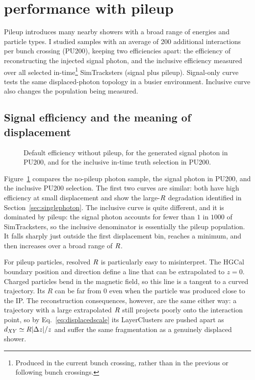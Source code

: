 \section{\cluethreed{} performance with pileup}
\label{sec:pileup}

Pileup introduces many nearby showers with a broad range of energies and
particle types. I studied samples with an average of 200 additional interactions per bunch
crossing (PU200), keeping two efficiencies apart: the efficiency of
reconstructing the injected signal photon, and the inclusive efficiency
measured over all selected in-time\footnote{Produced in the current bunch
crossing, rather than in the previous or following bunch crossings.}
SimTracksters (signal plus pileup). Signal-only curve tests the same displaced-photon topology in a busier
environment. Inclusive curve also changes the population being
measured.

\subsection{Signal efficiency and the meaning of displacement}

\begin{figure}[!htbp]
  \centering
{}
  \caption{Default \cluethreed{} efficiency without pileup, for the generated
  signal photon in PU200, and for the inclusive in-time truth selection in
  PU200.}
  \label{fig:pileupefficiency}
\end{figure}

Figure~\ref{fig:pileupefficiency} compares the no-pileup photon sample, the
signal photon in PU200, and the inclusive PU200 selection. The first two
curves are similar: both have high efficiency at small displacement and
show the large-$R$ degradation identified in
Section~\ref{sec:singlephoton}. The inclusive curve is quite different, and it
is dominated by pileup: the signal photon accounts for fewer than $1$ in
$1000$ of SimTracksters, so the inclusive denominator is
essentially the pileup population. It
falls sharply just outside the first displacement bin, reaches a minimum,
and then increases over a broad range of $R$.

For pileup particles, resolved $R$ is particularly easy to misinterpret. The
HGCal boundary position and direction define a line that can be extrapolated to
$z=0$. Charged particles bend in the magnetic field, so this line is a tangent
to a curved trajectory. Its $R$ can be far from 0 even when
the particle was produced close to the IP. The
reconstruction consequences, however, are the same either way: a trajectory
with a large extrapolated $R$ still projects poorly onto the interaction point, so by
Eq.~\eqref{eq:displacedscale} its LayerClusters are pushed apart as
$d_{XY}\simeq R|\Delta z|/z$ and suffer the same fragmentation as a genuinely
displaced shower.

